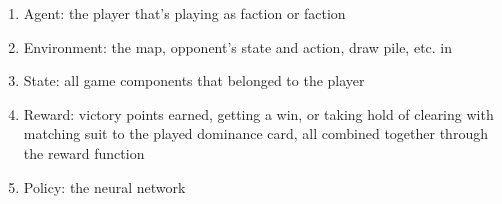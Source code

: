 \begin{enumerate}
  \item Agent: the player that's playing as \Marquise{} faction or \Eyrie{} faction
  \item Environment: the map, opponent's state and action, draw pile, etc. in \RootOurs %
  \item State: all game components that belonged to the player
  \item Reward: victory points earned, getting a win, or taking hold of clearing with matching suit to the played dominance card, all combined together through the reward function 
  \item Policy: the neural network
\end{enumerate}

